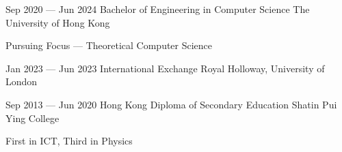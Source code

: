 \educationEntry
{Sep 2020 --- Jun 2024}
{Bachelor of Engineering in Computer Science}
{The University of Hong Kong}
{
\begin{descitemize}
    \item Pursuing Focus --- Theoretical Computer Science
\end{descitemize}
}

\educationEntry
{Jan 2023 --- Jun 2023}
{International Exchange}
{Royal Holloway, University of London}
{}

\educationEntry
{Sep 2013 --- Jun 2020}
{Hong Kong Diploma of Secondary Education}
{Shatin Pui Ying College}
{
\begin{descitemize}
    \specialitem First in ICT, Third in Physics
\end{descitemize}
}
